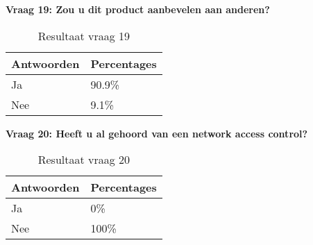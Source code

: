 \textbf{Vraag 19: Zou u dit product aanbevelen aan anderen?}

\begin{table}[H]
	\begin{center}
		\begin{tabular}{|l|l|}
					\hline
			\bf Antwoorden    & \bf Percentages \\ \hline
			Ja      & 90.9\% \\ \hline
			Nee     & 9.1\%    \\ \hline                                                                                                                           
		\end{tabular}
		\caption{Resultaat vraag 19}
	\end{center}
\end{table}

\textbf{Vraag 20: Heeft u al gehoord van een network access control?}

\begin{table}[h!]
	\begin{center}
		\begin{tabular}{|l|l|}
		\hline
		\bf Antwoorden    & \bf Percentages \\ \hline
		Ja      & 0\% \\ \hline
		Nee     & 100\%    \\ \hline                                                      
		\end{tabular}
		\caption{Resultaat vraag 20}
	\end{center}
\end{table}



